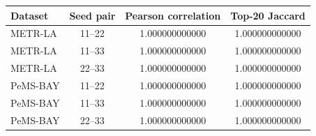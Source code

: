 \begin{tabular}{lccc}
\toprule
Dataset & Seed pair & Pearson correlation & Top-20 Jaccard\\
\midrule
METR-LA & 11--22 & 1.000000000000 & 1.000000000000\\
METR-LA & 11--33 & 1.000000000000 & 1.000000000000\\
METR-LA & 22--33 & 1.000000000000 & 1.000000000000\\
PeMS-BAY & 11--22 & 1.000000000000 & 1.000000000000\\
PeMS-BAY & 11--33 & 1.000000000000 & 1.000000000000\\
PeMS-BAY & 22--33 & 1.000000000000 & 1.000000000000\\
\bottomrule
\end{tabular}